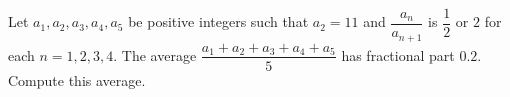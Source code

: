 Let $a_1,a_2,a_3,a_4,a_5$ be positive integers such that $a_2=11$ and $\dfrac{a_n}{a_{n+1}}$ is $\dfrac12$ or $2$ for each $n=1,2,3,4$. The average $\dfrac{a_1+a_2+a_3+a_4+a_5}{5}$ has fractional part $0.2$. Compute this average.
